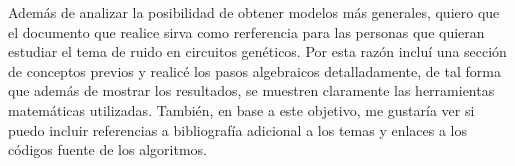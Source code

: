 \documentclass[12pt, letterpaper]{article}
\begin{document}
Adem\'as de analizar la posibilidad de obtener modelos m\'as generales, quiero que el documento que realice sirva como rerferencia para las personas que quieran estudiar el tema de ruido en circuitos gen\'eticos. Por esta raz\'on inclu\'i una secci\'on de conceptos previos y realic\'e los pasos algebraicos detalladamente, de tal forma que adem\'as de mostrar los resultados, se muestren claramente las herramientas matem\'aticas utilizadas. Tambi\'en, en base a este objetivo, me gustar\'ia ver si puedo incluir referencias a bibliograf\'ia adicional a los temas y enlaces a los c\'odigos fuente de los algoritmos.
\end{document}
